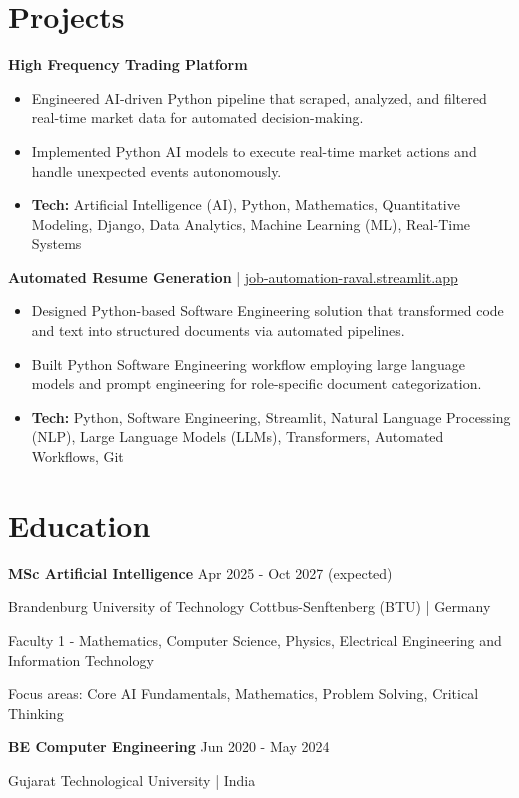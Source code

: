 \documentclass[a4paper,10pt]{article}
\begin{document}
\section*{Projects}
\textbf{High Frequency Trading Platform}\par
\begin{itemize}
\item Engineered AI-driven Python pipeline that scraped, analyzed, and filtered real-time market data for automated decision-making.
\item Implemented Python AI models to execute real-time market actions and handle unexpected events autonomously.
\item \textbf{Tech:} Artificial Intelligence (AI), Python, Mathematics, Quantitative Modeling, Django, Data Analytics, Machine Learning (ML), Real-Time Systems
\end{itemize}
\vspace{3pt}
\textbf{Automated Resume Generation} | \href{https://job-automation-raval.streamlit.app/}{job-automation-raval.streamlit.app}\par
\begin{itemize}
\item Designed Python-based Software Engineering solution that transformed code and text into structured documents via automated pipelines.
\item Built Python Software Engineering workflow employing large language models and prompt engineering for role-specific document categorization.
\item \textbf{Tech:} Python, Software Engineering, Streamlit, Natural Language Processing (NLP), Large Language Models (LLMs), Transformers, Automated Workflows, Git
\end{itemize}
\vspace{3pt}

\section*{Education}
\textbf{MSc Artificial Intelligence} \hfill Apr 2025 - Oct 2027 (expected)\par
Brandenburg University of Technology Cottbus-Senftenberg (BTU) | Germany\par
Faculty 1 - Mathematics, Computer Science, Physics, Electrical Engineering and Information Technology\par
Focus areas: Core AI Fundamentals, Mathematics, Problem Solving, Critical Thinking\par
\vspace{3pt}
\textbf{BE Computer Engineering} \hfill Jun 2020 - May 2024\par
Gujarat Technological University | India\par
\vspace{3pt}
\end{document}
